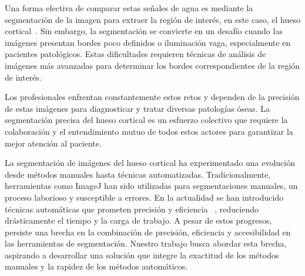 \documentclass[conference]{IEEEtran}
\begin{document}
\noindent Una forma efectiva de comparar estas señales de agua es mediante la segmentación de la imagen para extraer la región de interés, en este caso, el hueso cortical~\cite{segmentation_bandyopadhyay_2021}. Sin embargo, la segmentación se convierte en un desafío cuando las imágenes presentan bordes poco definidos o iluminación vaga, especialmente en pacientes patológicos. Estas dificultades requieren técnicas de análisis de imágenes más avanzadas para determinar los bordes correspondientes de la región de interés.


\noindent Los profesionales enfrentan constantemente estos retos y dependen de la precisión de estas imágenes para diagnosticar y tratar diversas patologías óseas. La segmentación precisa del hueso cortical es un esfuerzo colectivo que requiere la colaboración y el entendimiento mutuo de todos estos actores para garantizar la mejor atención al paciente.



\noindent La segmentación de imágenes del hueso cortical ha experimentado una evolución desde métodos manuales hasta técnicas automatizadas. Tradicionalmente, herramientas como ImageJ han sido utilizadas para segmentaciones manuales, un proceso laborioso y susceptible a errores.
\noindent En la actualidad se han introducido técnicas automáticas que prometen precisión y eficiencia ~\cite{jones2023automated}, reduciendo drásticamente el tiempo y la carga de trabajo. A pesar de estos progresos, persiste una brecha en la combinación de precisión, eficiencia y accesibilidad en las herramientas de segmentación. Nuestro trabajo busca abordar esta brecha, aspirando a desarrollar una solución que integre la exactitud de los métodos manuales y la rapidez de los métodos automáticos.
\end{document}
